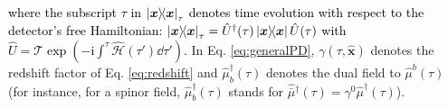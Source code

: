 \documentclass[prd,twocolumn,superscriptaddress,floatfix,amsmath,amssymb,amsfonts,longbibliography,nofootinbib]{revtex4-1}
\newcommand{\ii}{\mathrm{i}}
\newcommand{\tb}[1]{\textcolor{black}{#1}}
\begin{document}
\tb{where the subscript $\tau$ in $\ket{\bm x}\!\!\bra{\bm x}_\tau$ denotes time evolution with respect to the detector's free Hamiltonian: $\ket{\bm x}\!\!\bra{\bm x}_\tau = \hat{U}^\dagger(\tau)\ket{\bm x}\!\!\bra{\bm x}\hat{U}(\tau)$ with $\hat{U} = \mathcal{T}\exp(-\ii \int^\tau \hat{\mathcal{H}}(\tau')\dd \tau')$.} In Eq. \eqref{eq:generalPD}, $\gamma(\tau,\hat{\bm x})$ denotes the redshift factor of Eq. \eqref{eq:redshift} and $\hat{\mu}_b^\dagger(\tau)$ denotes the dual field to $\hat{\mu}^b(\tau)$ (for instance, for a spinor field, $\hat{\mu}_b^\dagger(\tau)$ stands for $\hat{\bar{\mu}}{}^\dagger(\tau) = \gamma^0\hat{{\mu}}^\dagger(\tau)$). %
\end{document}
